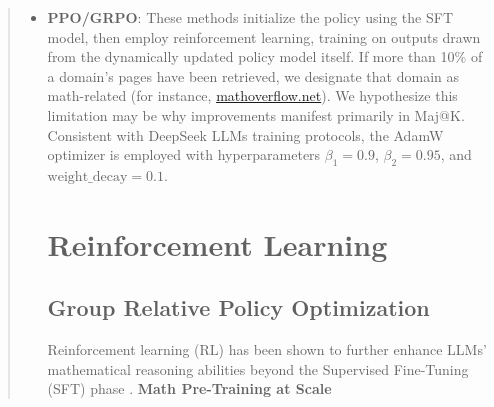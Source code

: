\begin{abstract}
\begin{itemize}[topsep=0pt]
\begin{itemize}[topsep=0pt]
We begin by outlining the insights gathered from pre-training. Each problem is paired with a corresponding solution expressed in formats such as chain-of-thought (CoT) \citep{cot}, program-of-thought (PoT) \citep{pot,pal}, or via tool-integrated reasoning \citep{tora}. \end{itemize}

Accordingly, these avenues merit further inquiry and are left as topics for future work. Unlike traditional approaches such as Proximal Policy Optimization (PPO), GRPO dispenses with the need for a critic model and instead relies on group score-based baseline estimation, thereby greatly decreasing the computational burden during training. DeepSeekMath-Base is built upon DeepSeek-Coder-Base-v1.5 7B \citep{deepseek-coder}, given our observation that initializing from a code-focused pre-trained model offers greater advantages than beginning with a general-purpose LLM. \section{Conclusion, Limitation, and Future Work} In this work, we introduce DeepSeekMath, which establishes a new standard for open-source models on the MATH benchmark at the competition level, achieving results close to those of proprietary systems. \item \textbf{PPO/GRPO}: These methods initialize the policy using the SFT model, then employ reinforcement learning, training on outputs drawn from the dynamically updated policy model itself. If more than 10\% of a domain's pages have been retrieved, we designate that domain as math-related (for instance, \url{mathoverflow.net}). We hypothesize this limitation may be why improvements manifest primarily in Maj@K. Consistent with DeepSeek LLMs training protocols, the AdamW optimizer \citep{adamW} is employed with hyperparameters $\beta_1=0.9$, $\beta_2=0.95$, and $\mathrm{weight\_decay}=0.1$. \section{Reinforcement Learning}

\subsection{Group Relative Policy Optimization}
Reinforcement learning (RL) has been shown to further enhance LLMs' mathematical reasoning abilities beyond the Supervised Fine-Tuning (SFT) phase \citep{wang2023math,wizardmath}. \textbf{Math Pre-Training at Scale}


\end{itemize}
\end{abstract}

